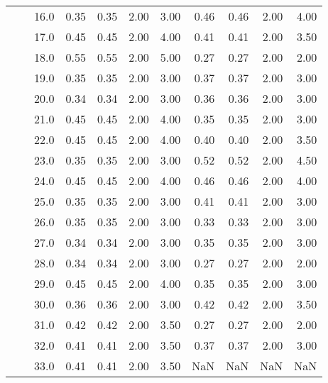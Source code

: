 \begin{tabular}{lllrrrrrrrr}
       &     & 16.0 &       0.35 &      0.35 & 2.00 &   3.00 &       0.46 &      0.46 & 2.00 &   4.00 \\
       &     & 17.0 &       0.45 &      0.45 & 2.00 &   4.00 &       0.41 &      0.41 & 2.00 &   3.50 \\
       &     & 18.0 &       0.55 &      0.55 & 2.00 &   5.00 &       0.27 &      0.27 & 2.00 &   2.00 \\
       &     & 19.0 &       0.35 &      0.35 & 2.00 &   3.00 &       0.37 &      0.37 & 2.00 &   3.00 \\
       &     & 20.0 &       0.34 &      0.34 & 2.00 &   3.00 &       0.36 &      0.36 & 2.00 &   3.00 \\
       &     & 21.0 &       0.45 &      0.45 & 2.00 &   4.00 &       0.35 &      0.35 & 2.00 &   3.00 \\
       &     & 22.0 &       0.45 &      0.45 & 2.00 &   4.00 &       0.40 &      0.40 & 2.00 &   3.50 \\
       &     & 23.0 &       0.35 &      0.35 & 2.00 &   3.00 &       0.52 &      0.52 & 2.00 &   4.50 \\
       &     & 24.0 &       0.45 &      0.45 & 2.00 &   4.00 &       0.46 &      0.46 & 2.00 &   4.00 \\
       &     & 25.0 &       0.35 &      0.35 & 2.00 &   3.00 &       0.41 &      0.41 & 2.00 &   3.00 \\
       &     & 26.0 &       0.35 &      0.35 & 2.00 &   3.00 &       0.33 &      0.33 & 2.00 &   3.00 \\
       &     & 27.0 &       0.34 &      0.34 & 2.00 &   3.00 &       0.35 &      0.35 & 2.00 &   3.00 \\
       &     & 28.0 &       0.34 &      0.34 & 2.00 &   3.00 &       0.27 &      0.27 & 2.00 &   2.00 \\
       &     & 29.0 &       0.45 &      0.45 & 2.00 &   4.00 &       0.35 &      0.35 & 2.00 &   3.00 \\
       &     & 30.0 &       0.36 &      0.36 & 2.00 &   3.00 &       0.42 &      0.42 & 2.00 &   3.50 \\
       &     & 31.0 &       0.42 &      0.42 & 2.00 &   3.50 &       0.27 &      0.27 & 2.00 &   2.00 \\
       &     & 32.0 &       0.41 &      0.41 & 2.00 &   3.50 &       0.37 &      0.37 & 2.00 &   3.00 \\
       &     & 33.0 &       0.41 &      0.41 & 2.00 &   3.50 &        NaN &       NaN &  NaN &    NaN \\

\end{tabular}
